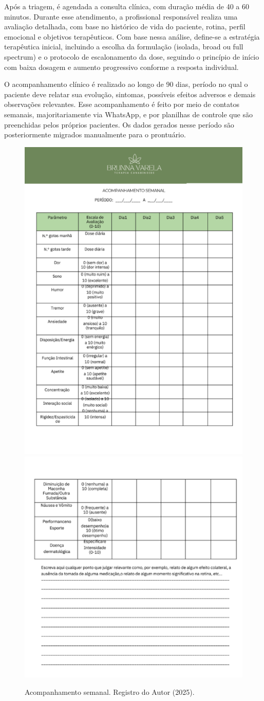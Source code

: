 \href{}{}\documentclass[12pt,portuguese,oneside]{article}
\begin{document}
Após a triagem, é agendada a consulta clínica, com duração média de 40 a 60 minutos. Durante esse atendimento, a profissional responsável realiza uma avaliação detalhada, com base no histórico de vida do paciente, rotina, perfil emocional e objetivos terapêuticos. Com base nessa análise, define-se a estratégia terapêutica inicial, incluindo a escolha da formulação (isolada, broad ou full spectrum) e o protocolo de escalonamento da dose, seguindo o princípio de início com baixa dosagem e aumento progressivo conforme a resposta individual.

O acompanhamento clínico é realizado ao longo de 90 dias, período no qual o paciente deve relatar sua evolução, sintomas, possíveis efeitos adversos e demais observações relevantes. Esse acompanhamento é feito por meio de contatos semanais, majoritariamente via WhatsApp, e por planilhas de controle que são preenchidas pelos próprios pacientes. Os dados gerados nesse período são posteriormente migrados manualmente para o prontuário.

\begin{figure}[H]
    \centering
    \includegraphics[width=0.4\linewidth]{imagens/acompanhamento1.png}
    \includegraphics[width=0.4\linewidth]{imagens/acompanhamento2.png}
    \caption{Acompanhamento semanal. Registro do Autor (2025).}
    \label{fig:acompanhamento.png}
\end{figure}
\end{document}
